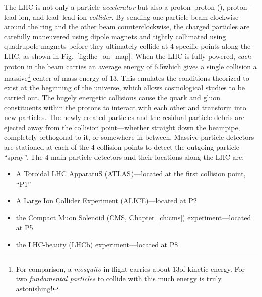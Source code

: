 The LHC is not only a particle \emph{accelerator} but also a proton--proton (\pp), proton--lead ion, and lead--lead ion \emph{collider}.
By sending one particle beam clockwise around the ring and the other beam counterclockwise, the charged particles are carefully maneuvered using dipole magnets and tightly collimated using quadrupole magnets before they ultimately collide at 4 specific points along the LHC, as shown in Fig.~\ref{fig:lhc_on_map}.
When the LHC is fully powered, \emph{each} proton in the beam carries an average energy of 6.5\TeV which gives a single \pp collision a massive\footnote{
    For comparison, a \emph{mosquito} in flight carries about 13\TeV of kinetic energy.
    For two \emph{fundamental particles} to collide with this much energy is truly astonishing!
} center-of-mass energy of 13\TeV.
This emulates the conditions theorized to exist at the beginning of the universe, which allows cosmological studies to be carried out.
The hugely energetic \pp collisions cause the quark and gluon constituents within the protons to interact with each other and transform into new particles.
The newly created particles and the residual particle debris are ejected away from the collision point---whether straight down the beampipe, completely orthogonal to it, or somewhere in between.
Massive particle detectors are stationed at each of the 4 collision points to detect the outgoing particle ``spray''.
The 4 main particle detectors and their locations along the LHC are:
\begin{itemize}
    \item A Toroidal LHC ApparatuS (ATLAS)---located at the first collision point, ``P1''
    \item A Large Ion Collider Experiment (ALICE)---located at P2
    \item the Compact Muon Solenoid (CMS, Chapter~\ref{ch:cms}) experiment---located at P5
    \item the LHC-beauty (LHCb) experiment---located at P8
\end{itemize}


